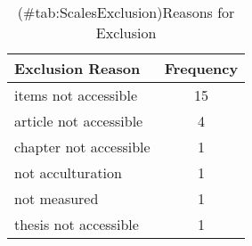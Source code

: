 \begin{table}

\caption{(\#tab:ScalesExclusion)Reasons for Exclusion}
\begin{tabular}[t]{lc}
\toprule
Exclusion Reason & Frequency\\
\midrule
items not accessible & 15\\
article not accessible & 4\\
chapter not accessible & 1\\
not acculturation & 1\\
not measured & 1\\
thesis not accessible & 1\\
\bottomrule
\end{tabular}
\end{table}
